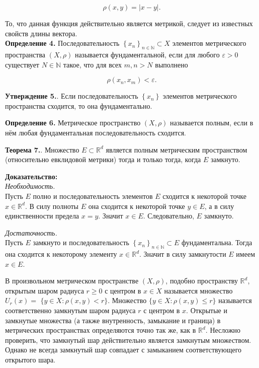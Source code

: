 \documentclass[a4paper,12pt]{article} %
\begin{document}
$$
\rho(x, y)=|x-y| .
$$

То, что данная функция действительно является метрикой, следует из известных свойств длины вектора.\\ \textbf{Определение 4.} Последовательность $\left\{x_{n}\right\}_{n \in \mathbb{N}} \subset X$ элементов метрического пространства $(X, \rho)$ называется фундаментальной, если для любого $\varepsilon>0$ существует $N \in \mathbb{N}$ такое, что для всех $m, n>N$ выполнено

$$
\rho\left(x_{n}, x_{m}\right)<\varepsilon .
$$

\textbf{Утверждение 5.}. Если последовательность $\left\{x_{n}\right\}$ элементов метрического пространства сходится, то она фундаментально.

\textbf{Определение 6.} Метрическое пространство $(X, \rho)$ называется полным, если в нём любая фундаментальная последовательность сходится.

\textbf{Теорема 7.}. Множество $E \subset \mathbb{R}^{d}$ является полным метрическим пространством (относительно евклидовой метрики) тогда и только тогда, когда $E$ замкнуто.

\textbf{Доказательство:\\}
\textit{Необходимость.}\\ Пусть $E$ полно и последовательность элементов $E$ сходится к некоторой точке $x \in \mathbb{R}^{d}$. В силу полноты $E$ она сходится к некоторой точке $y \in E$, а в силу единственности предела $x=y$. Значит $x \in E$. Следовательно, $E$ замкнуто.

\textit{Достаточность.}\\ Пусть $E$ замкнуто и последовательность $\left\{x_{n}\right\}_{n \in \mathbb{N}} \subset E$ фундаментальна. Тогда она сходится к некоторому элементу $x \in \mathbb{R}^{d}$. Значит в силу замкнутости $E$ имеем $x \in E$.

В произвольном метрическом пространстве $(X, \rho)$, подобно пространству $\mathbb{R}^{d}$, открытым шаром радиуса $r \geq 0$ с центром в $x \in X$ называется множество $U_{r}(x)=$ $\{y \in X: \rho(x, y)<r\}$. Множество $\{y \in X: \rho(x, y) \leq r\}$ называется соответственно замкнутым шаром радиуса $r$ с центром в $x$. Открытые и замкнутые множества (а также внутренность, замыкание и граница) в метрических пространствах определяются точно так же, как в $\mathbb{R}^{d}$. Несложно проверить, что замкнутый шар действительно является замкнутым множеством. Однако не всегда замкнутый шар совпадает с замыканием соответствующего открытого шара.
\end{document}
